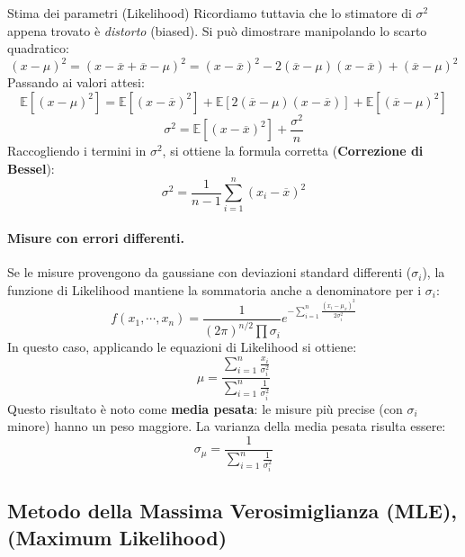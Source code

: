 \documentclass[openany,a4paper,12pt]{book}
\theoremstyle{remark}
\begin{document}
\begin{bressan}{Stima dei parametri (Likelihood)}
Ricordiamo tuttavia che lo stimatore di $\sigma^2$ appena trovato è \textit{distorto} (biased). Si può dimostrare manipolando lo scarto quadratico:
\begin{equation*}
    (x-\mu)^2 = (x - \overline{x} + \overline{x} - \mu)^2 = (x-\overline{x})^2 - 2(\overline{x}-\mu)(x-\overline{x}) + (\overline{x}-\mu)^2
\end{equation*}
Passando ai valori attesi:
\begin{equation*}
    \mathbb{E}\left[(x-\mu)^2\right] = \mathbb{E}\left[(x-\overline{x})^2\right] + \mathbb{E}\left[2(\overline{x}-\mu)(x-\overline{x})\right] + \mathbb{E}\left[(\overline{x}-\mu)^2\right]
\end{equation*}
\begin{equation*}
    \sigma^2 = \mathbb{E}\left[(x-\overline{x})^2\right] + \frac{\sigma^2}{n}                     
\end{equation*}
Raccogliendo i termini in $\sigma^2$, si ottiene la formula corretta (\textbf{Correzione di Bessel}):
\begin{equation*}
    \sigma^2 = \frac{1}{n-1}\sum_{i=1}^n {(x_i-\overline{x})^2}
\end{equation*}

\paragraph{Misure con errori differenti.}
Se le misure provengono da gaussiane con deviazioni standard differenti ($\sigma_i$), la funzione di Likelihood mantiene la sommatoria anche a denominatore per i $\sigma_i$:
\begin{equation*}
    f(x_1, \cdots, x_n) = \frac{1}{(2\pi)^{n/2} \prod \sigma_{i}} e^{-\sum_{i=1}^n \frac{(x_i - \mu_x)^2}{2\sigma_{i}^2}}
\end{equation*}
In questo caso, applicando le equazioni di Likelihood si ottiene:
\begin{equation*}
    \mu = \frac{\sum_{i=1}^n \frac{x_i}{\sigma_i^2} }{\sum_{i=1}^{n}\frac{1}{\sigma_i^2}}
\end{equation*}
Questo risultato è noto come \textbf{media pesata}: le misure più precise (con $\sigma_i$ minore) hanno un peso maggiore. La varianza della media pesata risulta essere:
\begin{equation*}
    \sigma_\mu = \frac{1}{\sum_{i=1}^{n}\frac{1}{\sigma_i^2}}
\end{equation*}
\end{bressan}


\subsection{Metodo della Massima Verosimiglianza (MLE), (Maximum Likelihood)}
\end{document}
